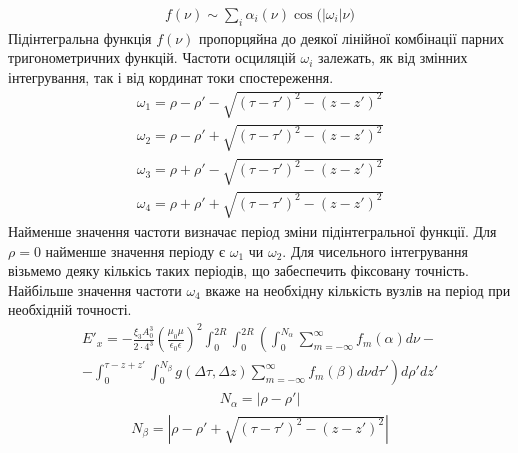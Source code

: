 %
\begin{equation*} \begin{aligned}
f (\nu) \sim \sum_i \alpha_i (\nu) 
\cos \big( \left| \omega_i \right| \nu \big)
\end{aligned} \end{equation*}
%
Підінтегральна функція $ f(\nu) $ пропорцяйна до деякої лінійної комбінації
парних тригонометричних функцій. Частоти осциляцій $ \omega_i $ залежать, 
як від змінних інтегрування, так і від кординат токи спостереження.
%
\begin{equation*} \begin{aligned}
\omega_1 = \rho - \rho' - \sqrt{(\tau-\tau')^2 - (z-z')^2}
\end{aligned} \end{equation*}
%
\begin{equation*} \begin{aligned}
\omega_2 = \rho - \rho' + \sqrt{(\tau-\tau')^2 - (z-z')^2}
\end{aligned} \end{equation*}
%
\begin{equation*} \begin{aligned}
\omega_3 = \rho + \rho' - \sqrt{(\tau-\tau')^2 - (z-z')^2}
\end{aligned} \end{equation*}
%
\begin{equation*} \begin{aligned}
\omega_4 = \rho + \rho' + \sqrt{(\tau-\tau')^2 - (z-z')^2}
\end{aligned} \end{equation*}
%
Найменше значення частоти визначає період зміни підінтегральної функції.
Для $ \rho = 0 $ найменше значення періоду є $ \omega_1 $ чи $ \omega_2 $.
Для чисельного інтегрування візьмемо деяку кількісь таких періодів, що 
забеспечить фіксовану точність. Найбільше значення частоти $ \omega_4 $ вкаже 
на необхідну кількість вузлів на період при необхідній точності.
%
\begin{equation*} \begin{aligned}
E'_x = - \frac{\xi_3 A_0^3}{2 \cdot 4^3} \left(
\frac{\mu_0 \mu} {\epsilon_0 \epsilon} \right)^2
\int_0^{2R} \int_0^{2R}
\left( \int_0^{N_\alpha} \sum_{m=-\infty}^\infty f_m (\alpha) d \nu \right. - \\ 
\left. - \int_0^{\tau - z + z'} \int_0^{N_\beta} g(\Delta \tau, \Delta z)
\sum_{m=-\infty}^\infty f_m (\beta) d \nu d \tau' \right) d \rho' dz'
\end{aligned} \end{equation*}
%
\begin{equation*} \begin{aligned}
N_\alpha = \left| \rho - \rho' \right|
\end{aligned} \end{equation*}
%
\begin{equation*} \begin{aligned}
N_\beta = \left| \rho - \rho' + \sqrt{(\tau-\tau')^2 - (z-z')^2} \right|
\end{aligned} \end{equation*}

